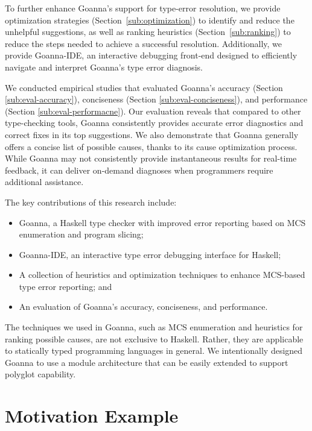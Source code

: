 	To further enhance Goanna's support for type-error resolution, we provide optimization strategies (Section~\ref{sub:optimization}) to identify and reduce the unhelpful suggestions, as well as ranking heuristics (Section~\ref{sub:ranking}) to reduce the steps needed to achieve a successful resolution. Additionally, we provide Goanna-IDE, an interactive debugging front-end designed to efficiently navigate and interpret Goanna's type error diagnosis.

    We conducted empirical studies that evaluated Goanna's accuracy (Section \ref{sub:eval-accuracy}), conciseness (Section \ref{sub:eval-conciseness}), and performance (Section \ref{sub:eval-performacne}). Our evaluation reveals that compared to other type-checking tools, Goanna consistently provides accurate error diagnostics and correct fixes in its top suggestions. We also demonstrate that Goanna generally offers a concise list of possible causes, thanks to its cause optimization process. While Goanna may not consistently provide instantaneous results for real-time feedback, it can deliver on-demand diagnoses when programmers require additional assistance.
    

    The key contributions of this research include:
    \begin{itemize}
        \item Goanna, a Haskell type checker with improved error reporting based on MCS enumeration and program slicing;
        \item Goanna-IDE, an interactive type error debugging interface for Haskell; 

        \item A collection of heuristics and optimization techniques to enhance MCS-based type error reporting; and

        \item An evaluation of Goanna's accuracy, conciseness, and performance.
    \end{itemize}

  The techniques we used in Goanna, such as MCS enumeration and heuristics for ranking possible causes, are not exclusive to Haskell. Rather, they are applicable to statically typed programming languages in general. We intentionally designed Goanna to use a module architecture that can be easily extended to support polyglot capability.
  
\section{Motivation Example}

